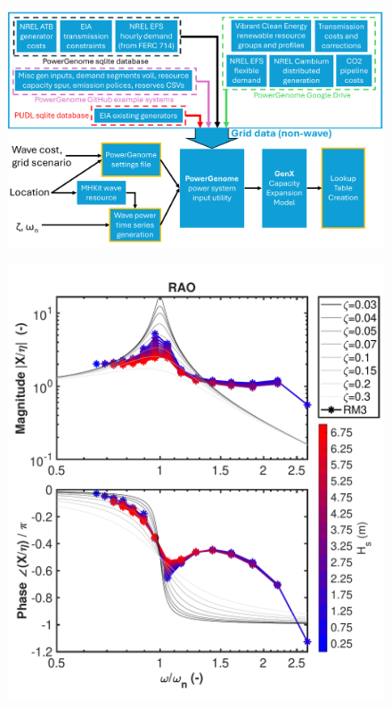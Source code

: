 \documentclass[10pt,twoside]{article}
\newif\ifplaceholder
\let\originalincludegraphics\includegraphics
\renewcommand{\includegraphics}[2][]{%
  \ifplaceholder
    \begin{tikzpicture}
      \node[anchor=south west, inner sep=0] (img) at (0,0) {\originalincludegraphics[#1]{#2}};
      \node at ($(img.south east)!0.5!(img.north west)$)
        [fill=white,opacity=0.8,text=red,font=\huge] {Placeholder};
    \end{tikzpicture}
    \vspace{-\baselineskip}
  \else
    \originalincludegraphics[#1]{#2}%
  \fi
  \placeholderfalse %
}
\begin{document}
\begin{figure}[t]
\noindent
\begin{minipage}[b]{0.64\textwidth}
    \centering
    \includegraphics[width=\linewidth]{figures/PowerGenomeDataFlow_no_beta.pdf}
    \label{fig:CEM-data-flow}
\end{minipage}
\hfill
\begin{minipage}[b]{0.36\textwidth}
    \centering
    \includegraphics[width=\linewidth]{figures/bode_second_order.pdf}
    \label{fig:bode}
\end{minipage}
\end{figure}
\end{document}
